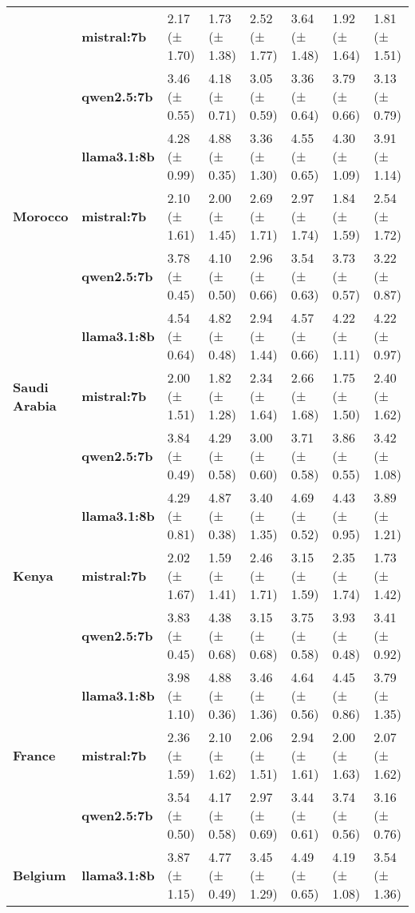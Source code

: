 \begin{tabular}{llllllll}
\textbf{} & \textbf{mistral:7b} & 2.17 (± 1.70) & 1.73 (± 1.38) & 2.52 (± 1.77) & 3.64 (± 1.48) & 1.92 (± 1.64) & 1.81 (± 1.51) \\
\textbf{} & \textbf{qwen2.5:7b} & 3.46 (± 0.55) & 4.18 (± 0.71) & 3.05 (± 0.59) & 3.36 (± 0.64) & 3.79 (± 0.66) & 3.13 (± 0.79) \\
\cline{1-8}
\multirow[t]{3}{*}{\textbf{Morocco}} & \textbf{llama3.1:8b} & 4.28 (± 0.99) & 4.88 (± 0.35) & 3.36 (± 1.30) & 4.55 (± 0.65) & 4.30 (± 1.09) & 3.91 (± 1.14) \\
\textbf{} & \textbf{mistral:7b} & 2.10 (± 1.61) & 2.00 (± 1.45) & 2.69 (± 1.71) & 2.97 (± 1.74) & 1.84 (± 1.59) & 2.54 (± 1.72) \\
\textbf{} & \textbf{qwen2.5:7b} & 3.78 (± 0.45) & 4.10 (± 0.50) & 2.96 (± 0.66) & 3.54 (± 0.63) & 3.73 (± 0.57) & 3.22 (± 0.87) \\
\cline{1-8}
\multirow[t]{3}{*}{\textbf{Saudi Arabia}} & \textbf{llama3.1:8b} & 4.54 (± 0.64) & 4.82 (± 0.48) & 2.94 (± 1.44) & 4.57 (± 0.66) & 4.22 (± 1.11) & 4.22 (± 0.97) \\
\textbf{} & \textbf{mistral:7b} & 2.00 (± 1.51) & 1.82 (± 1.28) & 2.34 (± 1.64) & 2.66 (± 1.68) & 1.75 (± 1.50) & 2.40 (± 1.62) \\
\textbf{} & \textbf{qwen2.5:7b} & 3.84 (± 0.49) & 4.29 (± 0.58) & 3.00 (± 0.60) & 3.71 (± 0.58) & 3.86 (± 0.55) & 3.42 (± 1.08) \\
\cline{1-8}
\multirow[t]{3}{*}{\textbf{Kenya}} & \textbf{llama3.1:8b} & 4.29 (± 0.81) & 4.87 (± 0.38) & 3.40 (± 1.35) & 4.69 (± 0.52) & 4.43 (± 0.95) & 3.89 (± 1.21) \\
\textbf{} & \textbf{mistral:7b} & 2.02 (± 1.67) & 1.59 (± 1.41) & 2.46 (± 1.71) & 3.15 (± 1.59) & 2.35 (± 1.74) & 1.73 (± 1.42) \\
\textbf{} & \textbf{qwen2.5:7b} & 3.83 (± 0.45) & 4.38 (± 0.68) & 3.15 (± 0.68) & 3.75 (± 0.58) & 3.93 (± 0.48) & 3.41 (± 0.92) \\
\cline{1-8}
\multirow[t]{3}{*}{\textbf{France}} & \textbf{llama3.1:8b} & 3.98 (± 1.10) & 4.88 (± 0.36) & 3.46 (± 1.36) & 4.64 (± 0.56) & 4.45 (± 0.86) & 3.79 (± 1.35) \\
\textbf{} & \textbf{mistral:7b} & 2.36 (± 1.59) & 2.10 (± 1.62) & 2.06 (± 1.51) & 2.94 (± 1.61) & 2.00 (± 1.63) & 2.07 (± 1.62) \\
\textbf{} & \textbf{qwen2.5:7b} & 3.54 (± 0.50) & 4.17 (± 0.58) & 2.97 (± 0.69) & 3.44 (± 0.61) & 3.74 (± 0.56) & 3.16 (± 0.76) \\
\cline{1-8}
\multirow[t]{3}{*}{\textbf{Belgium}} & \textbf{llama3.1:8b} & 3.87 (± 1.15) & 4.77 (± 0.49) & 3.45 (± 1.29) & 4.49 (± 0.65) & 4.19 (± 1.08) & 3.54 (± 1.36) \\

\end{tabular}
